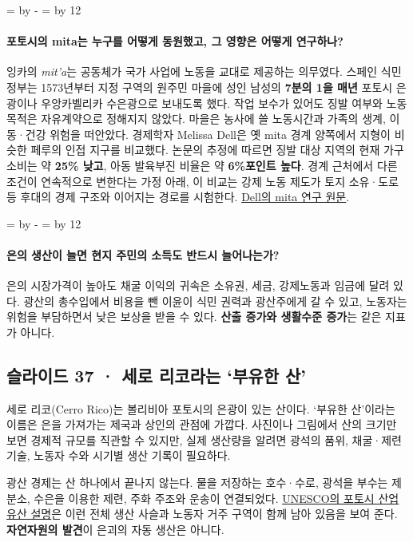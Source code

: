 \documentclass[10pt,a4paper]{article}
\newcommand{\ReserveQuestionSpace}{%
  \par\begingroup
  \dimen0=\pagegoal \advance\dimen0 by -\pagetotal
  \dimen2=\baselineskip \multiply\dimen2 by 12
  \ifdim\dimen0<\dimen2 \newpage\fi
  \endgroup}
\begin{document}
\ReserveQuestionSpace
\paragraph{포토시의 mita는 누구를 어떻게 동원했고, 그 영향은 어떻게 연구하나?}
잉카의 \emph{mit'a}는 공동체가 국가 사업에 노동을 교대로 제공하는 의무였다. 스페인 식민 정부는 1573년부터 지정 구역의 원주민 마을에 성인 남성의 \textbf{7분의 1을 매년} 포토시 은광이나 우앙카벨리카 수은광으로 보내도록 했다. 작업 보수가 있어도 징발 여부와 노동 목적은 자유계약으로 정해지지 않았다. 마을은 농사에 쓸 노동시간과 가족의 생계, 이동·건강 위험을 떠안았다. 경제학자 Melissa Dell은 옛 mita 경계 양쪽에서 지형이 비슷한 페루의 인접 지구를 비교했다. 논문의 추정에 따르면 징발 대상 지역의 현재 가구 소비는 약 \textbf{25\% 낮고}, 아동 발육부진 비율은 약 \textbf{6\%포인트 높다}. 경계 근처에서 다른 조건이 연속적으로 변한다는 가정 아래, 이 비교는 강제 노동 제도가 토지 소유·도로 등 후대의 경제 구조와 이어지는 경로를 시험한다. \href{https://scholar.harvard.edu/files/dell/files/ecta8121\_0.pdf}{Dell의 mita 연구 원문}.\par

\ReserveQuestionSpace
\paragraph{은의 생산이 늘면 현지 주민의 소득도 반드시 늘어나는가?}
은의 시장가격이 높아도 채굴 이익의 귀속은 소유권, 세금, 강제노동과 임금에 달려 있다. 광산의 총수입에서 비용을 뺀 이윤이 식민 권력과 광산주에게 갈 수 있고, 노동자는 위험을 부담하면서 낮은 보상을 받을 수 있다. \textbf{산출 증가와 생활수준 증가}는 같은 지표가 아니다.\par

\subsection{슬라이드 37 · 세로 리코라는 ‘부유한 산’}
세로 리코(Cerro Rico)는 볼리비아 포토시의 은광이 있는 산이다. ‘부유한 산’이라는 이름은 은을 가져가는 제국과 상인의 관점에 가깝다. 사진이나 그림에서 산의 크기만 보면 경제적 규모를 직관할 수 있지만, 실제 생산량을 알려면 광석의 품위, 채굴·제련 기술, 노동자 수와 시기별 생산 기록이 필요하다.\par

광산 경제는 산 하나에서 끝나지 않는다. 물을 저장하는 호수·수로, 광석을 부수는 제분소, 수은을 이용한 제련, 주화 주조와 운송이 연결되었다. \href{https://whc.unesco.org/en/list/420}{UNESCO의 포토시 산업 유산 설명}은 이런 전체 생산 사슬과 노동자 거주 구역이 함께 남아 있음을 보여 준다. \textbf{자연자원의 발견}이 은괴의 자동 생산은 아니다.\par
\end{document}
